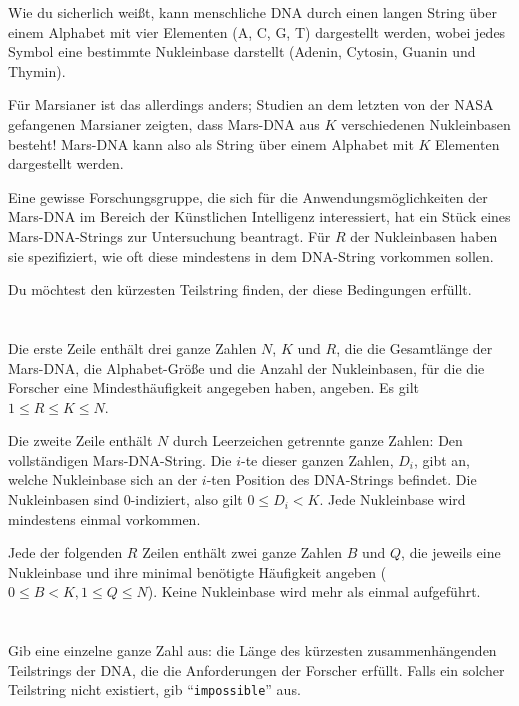 \ifx\boi\undefined\fi
\def\version{jury-1}
Wie du sicherlich weißt, kann menschliche DNA durch einen langen String über einem Alphabet mit vier Elementen (A, C, G, T) dargestellt werden, wobei jedes Symbol eine bestimmte Nukleinbase darstellt (Adenin, Cytosin, Guanin und Thymin).

Für Marsianer ist das allerdings anders; Studien an dem letzten von der NASA gefangenen Marsianer zeigten, dass Mars-DNA aus $K$ verschiedenen Nukleinbasen besteht! Mars-DNA kann also als String über einem Alphabet mit $K$ Elementen dargestellt werden.

Eine gewisse Forschungsgruppe, die sich für die Anwendungsmöglichkeiten der Mars-DNA im Bereich der Künstlichen Intelligenz interessiert, hat ein Stück eines Mars-DNA-Strings zur Untersuchung beantragt. Für $R$ der Nukleinbasen haben sie spezifiziert, wie oft diese mindestens in dem DNA-String vorkommen sollen.

Du möchtest den kürzesten Teilstring finden, der diese Bedingungen erfüllt.

\section*{}
Die erste Zeile enthält drei ganze Zahlen $N$, $K$ und $R$, die die Gesamtlänge der Mars-DNA, die Alphabet-Größe und die Anzahl der Nukleinbasen, für die die Forscher eine Mindesthäufigkeit angegeben haben, angeben. Es gilt $1 \le R \le K \le N$.

Die zweite Zeile enthält $N$ durch Leerzeichen getrennte ganze Zahlen: Den vollständigen Mars-DNA-String.
Die $i$-te dieser ganzen Zahlen, $D_i$, gibt an, welche Nukleinbase sich an der $i$-ten Position des DNA-Strings befindet.
Die Nukleinbasen sind $0$-indiziert, also gilt $0 \leq D_i < K$. Jede Nukleinbase wird mindestens einmal vorkommen.

Jede der folgenden $R$ Zeilen enthält zwei ganze Zahlen $B$ und $Q$, die jeweils eine Nukleinbase und ihre minimal benötigte Häufigkeit angeben ($0 \le B < K, 1 \le Q \le N$).
Keine Nukleinbase wird mehr als einmal aufgeführt.

\section*{\outputsection}
Gib eine einzelne ganze Zahl aus: die Länge des kürzesten zusammenhängenden Teilstrings der DNA, die die Anforderungen der Forscher erfüllt.
Falls ein solcher Teilstring nicht existiert, gib ``\texttt{impossible}'' aus.

